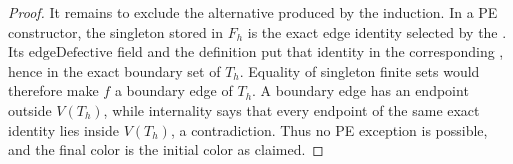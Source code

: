 \begin{proof}
It remains to exclude the alternative produced by the induction.  In a
PE constructor, the singleton stored in \(F_h\) is the exact edge
identity selected by the .  Its
\(\mathrm{edgeDefective}\) field and the definition
 put that identity in the corresponding
, hence in the exact boundary set
 of \(T_h\).  Equality of singleton finite sets
would therefore make \(f\) a boundary edge of \(T_h\).  A boundary edge
has an endpoint outside \(V(T_h)\), while internality says that every
endpoint of the same exact identity lies inside \(V(T_h)\), a
contradiction.  Thus no PE exception is possible, and the final color is
the initial color as claimed.
\end{proof}

